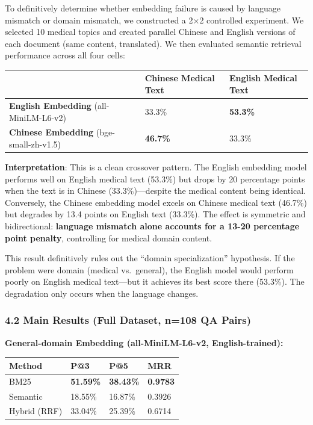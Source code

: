 \documentclass[
]{article}
\begin{document}
To definitively determine whether embedding failure is caused by
language mismatch or domain mismatch, we constructed a 2×2 controlled
experiment. We selected 10 medical topics and created parallel Chinese
and English versions of each document (same content, translated). We
then evaluated semantic retrieval performance across all four cells:

\begin{longtable}[]{@{}lll@{}}
\toprule\noalign{}
& Chinese Medical Text & English Medical Text \\
\midrule\noalign{}
\endhead
\bottomrule\noalign{}
\endlastfoot
\textbf{English Embedding} (all-MiniLM-L6-v2) & 33.3\% &
\textbf{53.3\%} \\
\textbf{Chinese Embedding} (bge-small-zh-v1.5) & \textbf{46.7\%} &
33.3\% \\
\end{longtable}

\textbf{Interpretation}: This is a clean crossover pattern. The English
embedding model performs well on English medical text (53.3\%) but drops
by 20 percentage points when the text is in Chinese (33.3\%)---despite
the medical content being identical. Conversely, the Chinese embedding
model excels on Chinese medical text (46.7\%) but degrades by 13.4
points on English text (33.3\%). The effect is symmetric and
bidirectional: \textbf{language mismatch alone accounts for a 13-20
percentage point penalty}, controlling for medical domain content.

This result definitively rules out the ``domain specialization''
hypothesis. If the problem were domain (medical vs.~general), the
English model would perform poorly on English medical text---but it
achieves its best score there (53.3\%). The degradation only occurs when
the language changes.

\subsubsection{4.2 Main Results (Full Dataset, n=108 QA
Pairs)}\label{main-results-full-dataset-n108-qa-pairs}

\textbf{General-domain Embedding (all-MiniLM-L6-v2, English-trained):}

\begin{longtable}[]{@{}llll@{}}
\toprule\noalign{}
Method & P@3 & P@5 & MRR \\
\midrule\noalign{}
\endhead
\bottomrule\noalign{}
\endlastfoot
BM25 & \textbf{51.59\%} & \textbf{38.43\%} & \textbf{0.9783} \\
Semantic & 18.55\% & 16.87\% & 0.3926 \\
Hybrid (RRF) & 33.04\% & 25.39\% & 0.6714 \\
\end{longtable}
\end{document}
